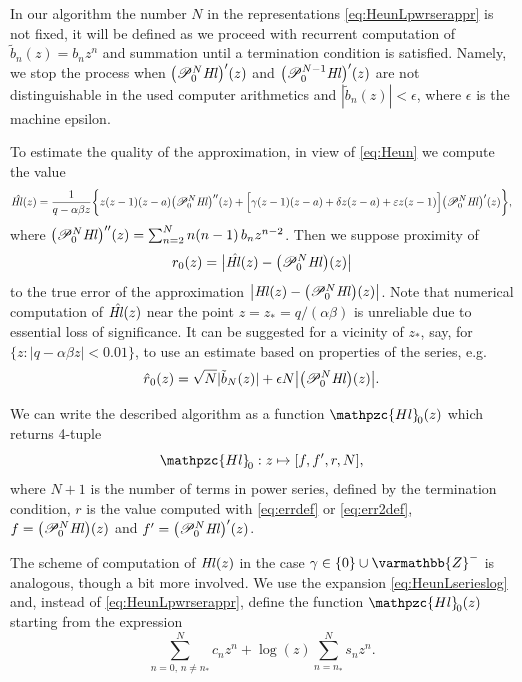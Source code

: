\documentclass[11pt]{article}
\newcommand{\MF}[1]{\mathop{#1}\nolimits}
\newcommand{\Zz}{\varmathbb{Z}}%
\def\HeunL{\MF{\textit{Hl\/}}}%
\def\psHeunL{\mathpzc{Hl}_{\!0}}%
\def\bz{\tilde{b}}%
\def\nsp{n_*}%
\begin{document}
In our algorithm the number $N$ in the representations
\eqref{eq:HeunLpwrserappr} is not fixed, it will be defined as we proceed with
recurrent computation of $\bz_n(z)=b_n z^n$ and summation until a termination
condition is satisfied. Namely, we stop the process when
$\bigl(\mathscr{P}_0^{N}\!\HeunL\bigr)'(z)$ and
$\bigl(\mathscr{P}_0^{N-1}\!\HeunL\bigr)'(z)$ are not distinguishable in the
used computer arithmetics and $|\bz_n(z)|<\epsilon$, where $\epsilon$ is the
machine epsilon.

To estimate the quality of the approximation, in view of \eqref{eq:Heun} we
compute the value
\[
  \skew5\Hat{\HeunL}(z)=\frac{1}{q-\alpha\beta z}\biggl\{z(z-1)(z-a)\bigl(\mathscr{P}_0^N\!\HeunL\bigr)''(z)+
  \Bigl[\gamma(z-1)(z-a)+\delta z(z-a)+\varepsilon z(z-1)\Bigr]\bigl(\mathscr{P}_0^N\!\HeunL\bigr)'(z)\biggr\},
\]
where $\bigl(\mathscr{P}_0^N\!\HeunL\bigr)''(z)=\sum_{n=2}^{N}n(n-1)\,b_n z^{n-2}$.
Then we suppose proximity of
\begin{equation}
\MF{r_0}(z)=\bigl|\skew5\Hat{\HeunL}(z)-\bigl(\mathscr{P}_0^N\!\HeunL\bigr)(z)\bigr|
\label{eq:errdef}
\end{equation}
to the true error of the approximation
$\bigl|\HeunL(z)-\bigl(\mathscr{P}_0^N\!\HeunL\bigr)(z)\bigr|$. Note that
numerical computation of $\skew5\Hat{\HeunL}(z)$ near the point
$z=z_*=q/(\alpha\beta)$ is unreliable due to essential loss of significance. It
can be suggested for a vicinity of $z_*$, say, for $\{z:|q-\alpha\beta
z|<0.01\}$,  to use an estimate based on properties of the series, e.g.
\begin{equation}
\MF{\Hat{r}\vphantom{r}_0}(z)=
\sqrt{N}|\bz_N(z)| + \epsilon N \bigl|\bigl(\mathscr{P}_0^N\!\HeunL\bigr)(z)\bigr|.
\label{eq:err2def}
\end{equation}

We can write the described algorithm as a function $\psHeunL(z)$ which returns 4-tuple
\[
 \psHeunL: z\mapsto [f,f',r,N],
\]
where $N+1$ is the number of terms in power series, defined by the termination
condition, $r$ is the value computed with \eqref{eq:errdef} or
\eqref{eq:err2def}, $f=\bigl(\mathscr{P}_0^N\!\HeunL\bigr)(z)$ and
$f'=\bigl(\mathscr{P}_0^N\!\HeunL\bigr)'(z)$.

The scheme of computation of $\HeunL(z)$ in the case $\gamma\in\{0\}\cup\Zz^-$
is analogous, though a bit more involved. We use the expansion
\eqref{eq:HeunLserieslog} and, instead of \eqref{eq:HeunLpwrserappr}, define the
function $\psHeunL(z)$ starting from the expression
\[
\sum_{n=0,\,n\neq\nsp}^{N}\!\!c_n z^n +\log(z)\sum_{n=\nsp}^{N}s_n z^n.
\]
\end{document}
